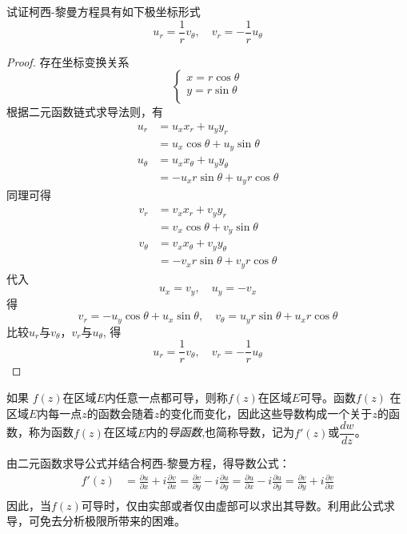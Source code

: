 \begin{example}
  试证柯西-黎曼方程具有如下极坐标形式
\begin{equation}
  u_r = \frac{1}{r}v_\theta, \quad v_r = -\frac{1}{r} u_\theta
\end{equation}
\end{example}
\begin{proof}
存在坐标变换关系
\[ \begin{cases}
	x = r\cos\theta \\
	y = r \sin \theta \\ 
\end{cases}\]
  根据二元函数链式求导法则，有
  \[ \begin{aligned}
    u_r &= u_x x_r + u_y y_r \\
        &= u_x \cos \theta + u_y \sin \theta \\
    u_\theta & = u_x x_\theta + u_y y_\theta \\
        & = -u_x  r \sin \theta  + u_y r \cos \theta 
  \end{aligned}\]
  同理可得
  \[ \begin{aligned}
    v_r &= v_x x_r + v_y y_r \\
        &= v_x \cos \theta + v_y \sin \theta \\
    v_\theta & = v_x x_\theta + v_y y_\theta \\
        & = -v_x  r \sin \theta  + v_y r \cos \theta 
  \end{aligned}\]
  代入
  \[ u_x = v_y, \quad u_y =-v_x\]
  得
  \[ v_r = -u_y \cos \theta + u_x \sin \theta, \quad  v_\theta = u_y  r \sin \theta  + u_x r \cos \theta  \]
  比较$u_r$与$v_\theta$，$v_r$与$u_\theta$, 得
  \[ u_r = \frac{1}{r}v_\theta, \quad v_r = -\frac{1}{r} u_\theta\]
\end{proof}

\begin{definition}
  如果 $f(z)$在区域$E$内任意一点都可导，则称$f(z)$在区域$E$可导。函数$f(z)$ 在区域$E$内每一点$z$的函数会随着$z$的变化而变化，因此这些导数构成一个关于$z$的函数，称为函数$f(z)$在区域$E$内的\emph{导函数},也简称导数，记为$f'(z)$或$\dfrac{dw}{dz}$。
  \end{definition}
  由二元函数求导公式并结合柯西-黎曼方程，得导数公式：
  \begin{equation}\label{} 
      \begin{aligned}
          f'(z) &= \frac{\partial u}{\partial x} + i \frac{\partial v }{\partial x} = \frac{\partial v}{\partial y} - i \frac{\partial u }{\partial y} = \frac{\partial u}{\partial x} - i \frac{\partial u }{\partial y} =
          \frac{\partial v}{\partial y} + i \frac{\partial v }{\partial x}   \\
      \end{aligned}
  \end{equation}
  因此，当$f(z)$可导时，仅由实部或者仅由虚部可以求出其导数。利用此公式求导，可免去分析极限所带来的困难。

